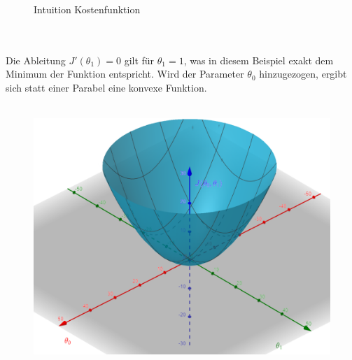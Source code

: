 \documentclass[a4paper]{scrreprt}
\begin{document}
\begin{enumerate}
\begin{figure}[h]
\label{Intuition Kostenfunktion}
\caption{Intuition Kostenfunktion}
\end{figure}
\\\\
Die Ableitung $J'(\theta_{1})=0$ gilt für $\theta_{1}=1$, was in diesem Beispiel exakt dem Minimum der Funktion entspricht. Wird der Parameter $\theta_{0}$ hinzugezogen, ergibt sich statt einer Parabel eine konvexe Funktion.\\\\
%
\begin{figure}[htbp]
\centering
\includegraphics[scale=.5]{Abbildungen/Lineare_Regression_5}

\end{figure}
\end{enumerate}
\end{document}

